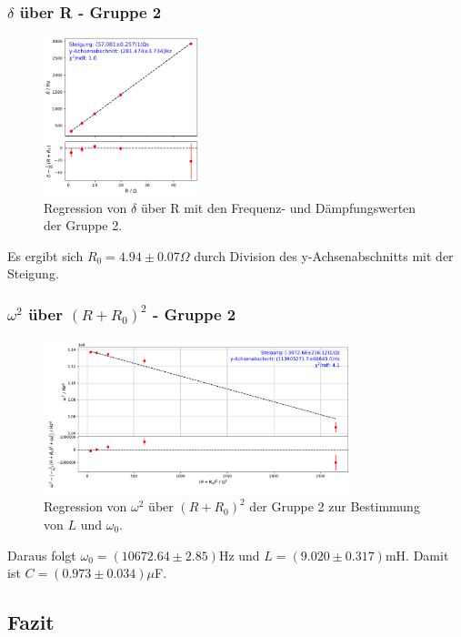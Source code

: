 \documentclass{beamer}
\begin{document}
\begin{frame}
\frametitle{$\delta$ über R - Gruppe 2}
\begin{figure}
\centering
\includegraphics[width=0.4\textwidth]{abbildungen/reg_delR.png}
\caption{Regression von $\delta$ über R mit den Frequenz- und Dämpfungswerten der Gruppe 2.}
\end{figure}
Es ergibt sich $R_0 = 4.94\pm 0.07\Omega$ durch Division des y-Achsenabschnitts mit der Steigung.
\end{frame}

\begin{frame}
\frametitle{$\omega^2$ über $(R+R_0)^2$ - Gruppe 2}
\begin{figure}
\centering
\includegraphics[width=0.8\textwidth]{abbildungen/reg_Rome.pdf}
\caption{Regression von $\omega^2$ über $(R+R_0)^2$ der Gruppe 2 zur Bestimmung von $L$ und $\omega_0$.}
\end{figure}
Daraus folgt $\omega_0 = (10672.64\pm2.85)$Hz und $L=(9.020 \pm 0.317)$mH. Damit ist $C = (0.973 \pm 0.034)\mu$F.
\end{frame}




\subsection{Fazit}
\end{document}
